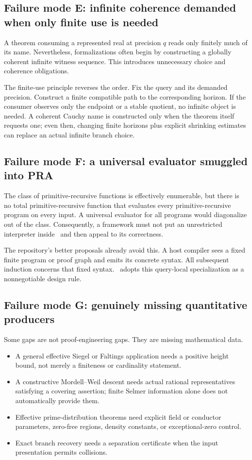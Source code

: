 \subsection{Failure mode E: infinite coherence demanded when only finite use is needed}

A theorem consuming a represented real at precision \(q\) reads only finitely much of its name.  Nevertheless, formalizations often begin by constructing a globally coherent infinite witness sequence.  This introduces unnecessary choice and coherence obligations.

The finite-use principle reverses the order.  Fix the query and its demanded precision.  Construct a finite compatible path to the corresponding horizon.  If the consumer observes only the endpoint or a stable quotient, no infinite object is needed.  A coherent Cauchy name is constructed only when the theorem itself requests one; even then, changing finite horizons plus explicit shrinking estimates can replace an actual infinite branch choice.

\subsection{Failure mode F: a universal evaluator smuggled into PRA}

The class of primitive-recursive functions is effectively enumerable, but there is no total primitive-recursive function that evaluates every primitive-recursive program on every input.  A universal evaluator for all programs would diagonalize out of the class.  Consequently, a framework must not put an unrestricted interpreter inside \iPRA\ and then appeal to its correctness.

The repository's better proposals already avoid this.  A host compiler sees a fixed finite program or proof graph and emits its concrete  syntax.  All subsequent induction concerns that fixed syntax.  \CIFER\ adopts this query-local specialization as a nonnegotiable design rule.

\subsection{Failure mode G: genuinely missing quantitative producers}

Some gaps are not proof-engineering gaps.  They are missing mathematical data.

\begin{itemize}
\item A general effective Siegel or Faltings application needs a positive height bound, not merely a finiteness or cardinality statement.
\item A constructive Mordell--Weil descent needs actual rational representatives satisfying a covering assertion; finite Selmer information alone does not automatically provide them.
\item Effective prime-distribution theorems need explicit field or conductor parameters, zero-free regions, density constants, or exceptional-zero control.
\item Exact branch recovery needs a separation certificate when the input presentation permits collisions.
\end{itemize}

